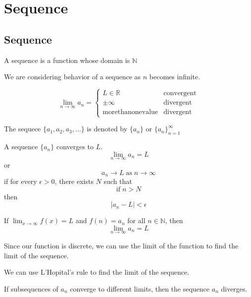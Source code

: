 \chapter{Sequence}

\section{Sequence}

\begin{definition}[Sequence]
  A sequence is a function whose domain is \(\mathbb{N}\)
\end{definition}

We are considering behavior of a sequence as \(n\) becomes infinite.

\[
  \lim_{n \to \infty} a_n = \begin{cases}
    L \in \mathbb{R} & \text{convergent} \\
    \pm \infty & \text{divergent} \\
    \mathrm{more than one value} & \text{divergent}
  \end{cases}
\]

\begin{definition}
  The sequece \(\{a_1, a_2, a_3, \dots\}\) is denoted by \(\{a_n\}\) or \(\{a_n\}_{n=1}^{\infty}\)
\end{definition}

\begin{theorem}
  A sequence \(\{a_n\}\) converges to \(L\).
  \[
    \lim_{n \to \infty} a_n = L
  \]
  or
  \[
    a_n \to L \; \mathrm{as} \; n \to \infty
  \]
  if for every \(\epsilon > 0\), there exists \(N\) such that
  \[
    \mathrm{if} \; n > N 
  \]
  then
  \[
    |a_n - L| < \epsilon
  \]
\end{theorem}

\begin{theorem}[]
  If \(\lim_{x \to \infty} f(x) = L\) and \(f(n) = a_n\) for all \(n \in \mathbb{N}\), then
  \[
    \lim_{n \to \infty} a_n = L
  \]
\end{theorem}

Since our function is discrete, we can use the limit of the function to find the limit of the sequence.

\begin{remark}
  We can use L'Hopital's rule to find the limit of the sequence.
\end{remark}

If subsequences of $a_{n}$ converge to different limits, then the sequence $a_{n}$ diverges.

